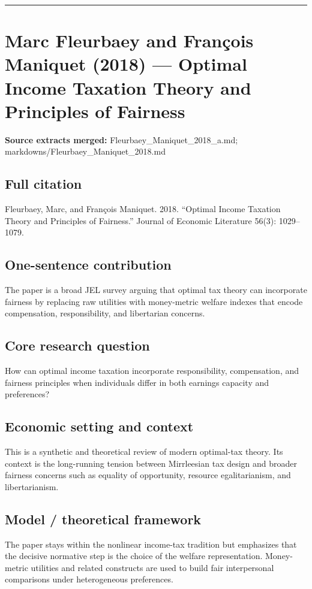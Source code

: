 \documentclass[11pt,a4paper]{article}
\begin{document}
\medskip\hrule\medskip

\section*{Marc Fleurbaey and François Maniquet (2018) — Optimal Income Taxation Theory and Principles of Fairness}

\textbf{Source extracts merged:} Fleurbaey\_Maniquet\_2018\_a.md; markdowns/Fleurbaey\_Maniquet\_2018.md

\subsection*{Full citation}
Fleurbaey, Marc, and François Maniquet. 2018. “Optimal Income Taxation Theory and Principles of Fairness.” Journal of Economic Literature 56(3): 1029–1079.

\subsection*{One-sentence contribution}
The paper is a broad JEL survey arguing that optimal tax theory can incorporate fairness by replacing raw utilities with money-metric welfare indexes that encode compensation, responsibility, and libertarian concerns.

\subsection*{Core research question}
How can optimal income taxation incorporate responsibility, compensation, and fairness principles when individuals differ in both earnings capacity and preferences?

\subsection*{Economic setting and context}
This is a synthetic and theoretical review of modern optimal-tax theory. Its context is the long-running tension between Mirrleesian tax design and broader fairness concerns such as equality of opportunity, resource egalitarianism, and libertarianism.

\subsection*{Model / theoretical framework}
The paper stays within the nonlinear income-tax tradition but emphasizes that the decisive normative step is the choice of the welfare representation. Money-metric utilities and related constructs are used to build fair interpersonal comparisons under heterogeneous preferences.
\end{document}
